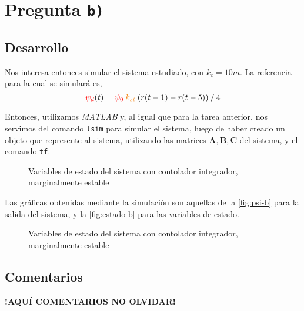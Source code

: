 \section{Pregunta \texttt{b)}}\label{pregunta-b}

\subsection{Desarrollo}

Nos interesa entonces simular el sistema estudiado, con $k_{c} = 10\unit{m}$.
La referencia para la cual se simulará es,
\begin{equation}
  \rojo{\psi_{d}}(t) = \rojo{\psi_{0}}\nara{k_{st}}\left(r(t-1) - r(t-5)\right) \mathbin{/} 4
  \label{eq:referencia}
\end{equation}

Entonces, utilizamos \textit{MATLAB} y, al igual que para la tarea anterior,
nos servimos del comando \verb|lsim| para simular el sistema, luego de haber
creado un objeto que represente al sistema, utilizando las matrices
$\mathbf{A}, \mathbf{B}, \mathbf{C}$ del sistema, y el comando \verb|tf|.

\begin{figure}[h]
  \centering
  
  \caption{Variables de estado del sistema con contolador integrador, marginalmente estable}
  \label{fig:psi-b}
\end{figure}

Las gráficas obtenidas mediante la simulación son aquellas de la \autoref{fig:psi-b} para
la salida del sistema, y la \autoref{fig:estado-b} para las variables de estado.

\begin{figure}[h]
  \centering
  
  \caption{Variables de estado del sistema con contolador integrador, marginalmente estable}
  \label{fig:estado-b}
\end{figure}

\FloatBarrier
\subsection{Comentarios}


\textbf{!AQUÍ COMENTARIOS NO OLVIDAR!}
